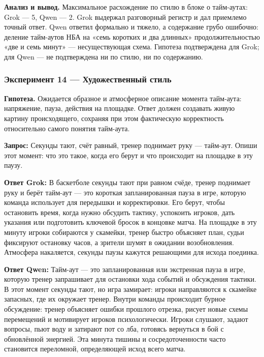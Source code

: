 \documentclass[a4paper, final]{article}
\begin{document}
\noindent\textbf{Анализ и вывод.} Максимальное расхождение по стилю в блоке о тайм-аутах: Grok — 5, Qwen — 2. Grok выдержал разговорный регистр и дал приемлемо точный ответ. Qwen ответил формально и тяжело, а содержание грубо ошибочно: деление тайм-аутов НБА на «семь коротких и два длинных» продолжительностью «две и семь минут» — несуществующая схема. Гипотеза подтверждена для Grok; для Qwen — не подтверждена ни по стилю, ни по содержанию.

\newpage

\subsubsection{Эксперимент 14 — Художественный стиль}

\noindent\textbf{Гипотеза.} Ожидается образное и атмосферное описание момента тайм-аута: напряжение, пауза, действия на площадке. Ответ должен создавать живую картину происходящего, сохраняя при этом фактическую корректность относительно самого понятия тайм-аута.

\noindent\textbf{Запрос:} Секунды тают, счёт равный, тренер поднимает руку — тайм-аут. Опиши этот момент: что это такое, когда его берут и что происходит на площадке в эту паузу.

\noindent\textbf{Ответ Grok:} В баскетболе секунды тают при равном счёде, тренер поднимает руку и берёт тайм-аут — это короткая запланированная пауза в игре, которую команда использует для передышки и корректировки. Его берут, чтобы остановить время, когда нужно обсудить тактику, успокоить игроков, дать указания или подготовить ключевой бросок в концовке матча. На площадке в эту минуту игроки собираются у скамейки, тренер быстро объясняет план, судьи фиксируют остановку часов, а зрители шумят в ожидании возобновления. Атмосфера накаляется, секунды паузы кажутся решающими для исхода поединка.

\noindent\textbf{Ответ Qwen:} Тайм-аут — это запланированная или экстренная пауза в игре, которую тренер запрашивает для остановки хода событий и обсуждения тактики. В этот момент секунды тают, но игра замирает: игроки направляются к скамейке запасных, где их окружает тренер. Внутри команды происходит бурное обсуждение: тренер объясняет ошибки прошлого отрезка, рисует новые схемы перемещений и мотивирует игроков психологически. Игроки слушают, задают вопросы, пьют воду и затирают пот со лба, готовясь вернуться в бой с обновлённой энергией. Эта минута тишины и сосредоточенности часто становится переломной, определяющей исход всего матча.
\end{document}
